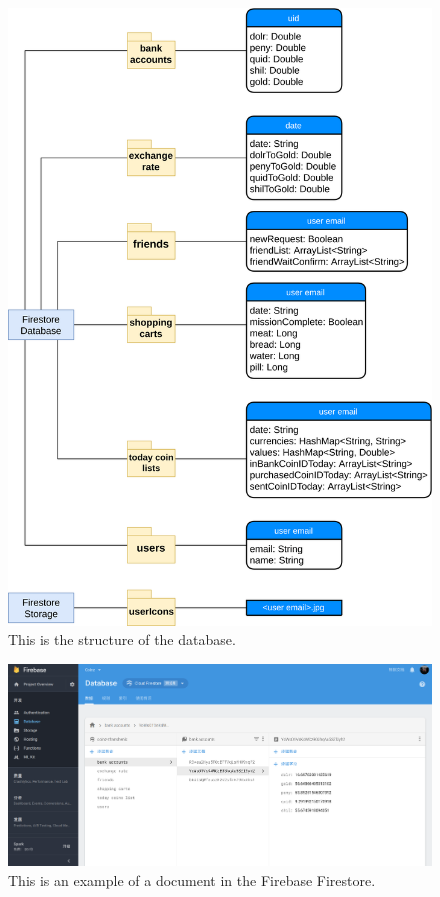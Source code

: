 \documentclass[12pt]{article}
\begin{document}
\begin{figure}
	\centering
	\includegraphics[scale=0.1]{Data.png}
	\caption{\label{fig:data}This is the structure of the database.}
\end{figure}
\begin{figure}
	\centering
	\includegraphics[scale=0.2]{Database.png}
	\caption{\label{fig:database}This is an example of a document in the Firebase Firestore.}
\end{figure}
\end{document}
